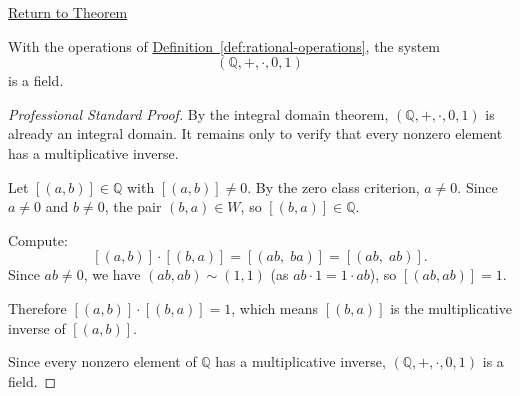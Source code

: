 \newpage
{}
\label{prf:q-is-field}

\begin{remark*}[Return]
\hyperref[thm:q-is-field]{Return to Theorem}
\end{remark*}

\begin{theorem*}
With the operations of
\hyperref[def:rational-operations]{Definition~\ref*{def:rational-operations}},
the system
\[
(\mathbb{Q},+,\cdot,0,1)
\]
is a field.
\end{theorem*}

\begin{proof}[Professional Standard Proof]
\LRAProofBodyStart
By the integral domain theorem, $(\mathbb{Q},+,\cdot,0,1)$ is already an
integral domain. It remains only to verify that every nonzero element has a
multiplicative inverse.

Let $[(a,b)]\in\mathbb{Q}$ with $[(a,b)]\neq 0$. By the zero class
criterion, $a\neq 0$. Since $a\neq 0$ and $b\neq 0$, the pair $(b,a)\in W$,
so $[(b,a)]\in\mathbb{Q}$.

Compute:
\[
[(a,b)]\cdot[(b,a)]
= [(ab,\;ba)]
= [(ab,\;ab)].
\]
Since $ab\neq 0$, we have $(ab,ab)\sim(1,1)$ (as $ab\cdot 1 = 1\cdot ab$),
so $[(ab,ab)] = 1$.

Therefore $[(a,b)]\cdot[(b,a)] = 1$, which means $[(b,a)]$ is the
multiplicative inverse of $[(a,b)]$.

Since every nonzero element of $\mathbb{Q}$ has a multiplicative inverse,
$(\mathbb{Q},+,\cdot,0,1)$ is a field.
\end{proof}

